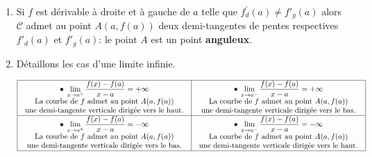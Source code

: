 \begin{enumerate}
\begin{center}
\end{center}
 \item Si $ f $ est dérivable  à droite et à gauche  de $ a $ telle que $ f^{'}_{d}(a)\neq f'_{g}(a) $ alors $ \mathcal{C} $ admet au  point $A(a,f(a))$ deux demi-tangentes de pentes respectives  $ f'_{d}(a)$ et $ f'_{g}(a) $: le point $A$ est un point \textbf{anguleux}.
 \item Détaillons les cas d'une limite infinie.

\medskip
\[
\begin{array}{|c|c|}
\hline
\begin{array}{c}
\bullet\; \displaystyle \lim_{x \to a^+} \dfrac{f(x)-f(a)}{x-a} = +\infty \\
\text{La courbe de } f \text{ admet au point } A(a, f(a)) \\
\text{une demi-tangente verticale dirigée vers le haut.}
\end{array}
&
\begin{array}{c}
\bullet\; \displaystyle \lim_{x \to a^-} \dfrac{f(x)-f(a)}{x-a} = +\infty \\
\text{La courbe de } f \text{ admet au point } A(a, f(a)) \\
\text{une demi-tangente verticale dirigée vers le bas.}
\end{array}
\\
\hline
\begin{array}{c}
\bullet\; \displaystyle \lim_{x \to a^+} \dfrac{f(x)-f(a)}{x-a} = -\infty \\
\text{La courbe de } f \text{ admet au point } A(a, f(a)) \\
\text{une demi-tangente verticale dirigée vers le bas.}
\end{array}
&
\begin{array}{c}
\bullet\; \displaystyle \lim_{x \to a^-} \dfrac{f(x)-f(a)}{x-a} = -\infty \\
\text{La courbe de } f \text{ admet au point } A(a, f(a)) \\
\text{une demi-tangente verticale dirigée vers le haut.}
\end{array}
\\
\hline
\end{array}
\]


\end{enumerate}
